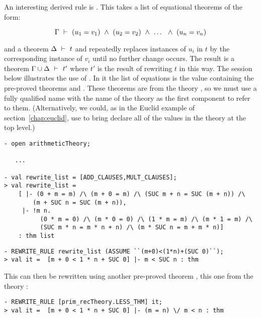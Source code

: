 An interesting derived rule is .  This takes a list of
equational theorems of the form:

\[ \Gamma\ \vdash\  (u_1 = v_1) \ \wedge\  (u_2 = v_2) \ \wedge\  \ldots\ \ \wedge\  (u_n  = v_n)\]

\noindent  and a theorem
$\Delta\ \vdash\  t$ and repeatedly replaces instances of $u_i$ in $t$ by
the corresponding instance of $v_i$ until no further change occurs.
The result is a theorem $\Gamma\cup\Delta\ \vdash\  t'$ where $t'$ is the
result of rewriting $t$ in this way.  The session below illustrates
the use of .  In it the list of equations is the
value  containing the pre-proved theorems
 and .  These theorems are from the
theory , so we must use a fully qualified name with the
name of the theory as the first component to refer to them.
(Alternatively, we could, as in the Euclid example of
section~\ref{chap:euclid}, use  to bring declare all of the
values in the theory at the top level.)

\begin{session}\begin{verbatim}
- open arithmeticTheory;

   ...

- val rewrite_list = [ADD_CLAUSES,MULT_CLAUSES];
> val rewrite_list =
    [ |- (0 + m = m) /\ (m + 0 = m) /\ (SUC m + n = SUC (m + n)) /\
        (m + SUC n = SUC (m + n)),
     |- !m n.
          (0 * m = 0) /\ (m * 0 = 0) /\ (1 * m = m) /\ (m * 1 = m) /\
          (SUC m * n = m * n + n) /\ (m * SUC n = m + m * n)]
    : thm list
\end{verbatim}\end{session}

\begin{session}\begin{verbatim}
- REWRITE_RULE rewrite_list (ASSUME ``(m+0)<(1*n)+(SUC 0)``);
> val it =  [m + 0 < 1 * n + SUC 0] |- m < SUC n : thm
\end{verbatim}\end{session}

\noindent
This can then be rewritten using another pre-proved theorem
, this one from the theory :

\begin{session}\begin{verbatim}
- REWRITE_RULE [prim_recTheory.LESS_THM] it;
> val it =  [m + 0 < 1 * n + SUC 0] |- (m = n) \/ m < n : thm
\end{verbatim}\end{session}

